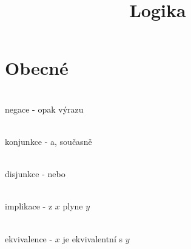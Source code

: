 \documentclass[a4paper,11pt]{article}
\title{Logika}
\begin{document}
\maketitle

\section{Obecné}

\begin{description}
    \item{}\\
        negace - opak výrazu
    \item{}\\
        konjunkce - a, současně
    \item{}\\
        disjunkce - nebo
    \item{}\\
        implikace - z $x$ plyne $y$
    \item{}\\
        ekvivalence - $x$ je ekvivalentní s $y$
\end{description}
\end{document}

